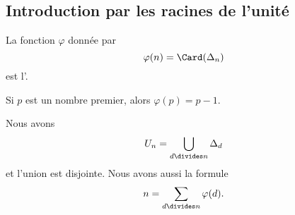 \subsection{Introduction par les racines de l'unité}

\begin{definition}      \label{DEFooWYIGooRVBTil}
	La fonction \( \varphi\) donnée par
	\begin{equation}    \label{EqEulerGqPsvi}
		\varphi(n)=\Card(\Delta_n)
	\end{equation}
	est l'.
\end{definition}
Si \( p\) est un nombre premier, alors \( \varphi(p)=p-1\).

\begin{lemma}       \label{LemKcpjee}
	Nous avons
	\begin{equation}        \label{EqpZuIyL}
		U_n=\bigcup_{d\divides n}\Delta_d
	\end{equation}
	et l'union est disjointe. Nous avons aussi la formule
	\begin{equation}        \label{EqTPHqgJ}
		n=\sum_{d\divides n}\varphi(d).
	\end{equation}
\end{lemma}

